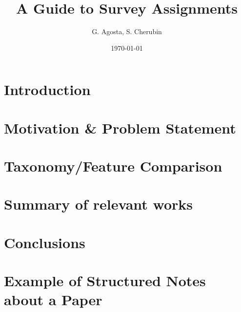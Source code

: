 \documentclass{article}
\title{A Guide to Survey Assignments %
}
\author{G. Agosta, S. Cherubin} %
\date{\today}
\begin{document}
\maketitle

\section{Introduction}
\label{sec:intro}


\section{Motivation \& Problem Statement}
\label{sec:motiv}


\section{Taxonomy/Feature Comparison}
\label{sec:taxon}


\section{Summary of relevant works}
\label{sec:rwork}


\section{Conclusions}
\label{sec:conc}





\newpage
\appendix

\section{Example of Structured Notes about a Paper}
\label{sec:append}

\end{document}
